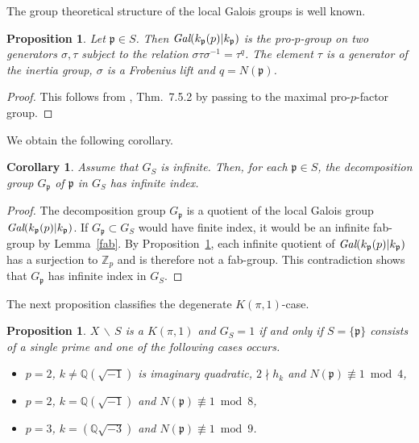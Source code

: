 \documentclass[10pt]{article}
\newcommand{\Q}{{\mathbb Q}}
\newcommand{\Z}{{\mathbb Z}}
\newcommand{\p}{{\mathfrak p}}
\newcommand{\sm}{{\,\smallsetminus\,}}
\newcommand{\Gal}{\text{\it Gal}}
\theoremstyle{alex}
\newtheorem{corollary}[theorem]{Corollary}
\newtheorem{proposition}[theorem]{Proposition}
\theoremstyle{alexdef}
\begin{document}
The group theoretical structure of the local Galois groups is well known.

\begin{proposition}\label{localstrukt}
Let $\p\in S$. Then $\Gal(k_\p(p)|k_\p)$ is the pro-$p$-group on two generators $\sigma, \tau$ subject to the relation $\sigma\tau\sigma^{-1}=\tau^q$. The element $\tau$ is a generator of the inertia group, $\sigma$ is a Frobenius lift and $q=N(\p)$.
\end{proposition}

\begin{proof}
This follows from \cite{NSW}, Thm.~7.5.2 by passing to the maximal pro-$p$-factor group.
\end{proof}

We obtain the following corollary.

\begin{corollary}\label{infinite_index}
Assume that $G_S$ is infinite. Then, for each $\p\in S$, the decomposition group $G_\p$ of\/ $\p$ in $G_S$ has infinite index.
\end{corollary}

\begin{proof} The decomposition group $G_\p$ is a quotient of the local Galois group $\Gal(k_\p(p)|k_\p)$.  If $G_\p \subset G_S$ would have finite index, it would be an infinite fab-group by Lemma~\ref{fab}.  By Proposition~\ref{localstrukt}, each infinite quotient of $\Gal(k_\p(p)|k_\p)$ has a surjection to $\Z_p$ and is therefore not a fab-group. This contradiction shows that $G_\p$ has infinite index in $G_S$.
\end{proof}



\bigskip
The next proposition classifies the degenerate $K(\pi,1)$-case.


\begin{proposition}\label{degen}
$X\sm S$ is a $K(\pi,1)$  and  $G_S=1$ if and only if  $S=\{\p\}$ consists of a single prime and one of the following cases occurs.
\begin{itemize}
\item[\rm (a)] $p=2$, $k\neq\Q(\sqrt{-1})$ is imaginary quadratic, $2\nmid h_k$ and \hbox{$N(\p)\not \equiv 1 \bmod 4$},
\item[\rm (b)] $p=2$, $k=\Q(\sqrt{-1})$ and $N(\p)\not \equiv 1 \bmod 8$,
\item[\rm (c)] $p=3$, $k=(\Q\sqrt{-3})$ and $N(\p) \not \equiv 1 \bmod 9$.
\end{itemize}
\end{proposition}
\end{document}
